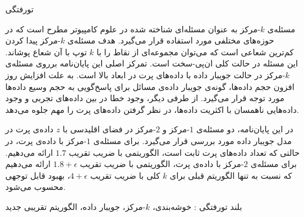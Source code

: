 


\pagestyle{empty}

‌تورفتگی

مسئله‌ی $k$-مرکز به عنوان مسئله‌ای شناخته شده در علوم کامپیوتر مطرح است که در حوزه‌های مختلفی مورد استفاده قرار می‌گیرد. هدف مسئله‌ی $k$-مرکز پیدا کردن کم‌ترین شعاعی است که می‌توان مجموعه‌ای از نقاط را با $k$ توپ با آن شعاع پوشاند. این مسئله در حالت کلی ان‌پی-سخت است. تمرکز اصلی این پایان‌نامه برروی مسئله‌ی $k$-مرکز در حالت جویبار داده با داده‌های پرت در ابعاد بالا است. به علت افزایش روز افزون حجم داده‌ها، گونه‌ی جویبار داده‌ی مسائل برای پاسخ‌گویی به حجم وسیع داده‌ها مورد توجه قرار می‌گیرد. از طرفی دیگر، وجود خطا در بین داده‌های تجربی و وجود داده‌هایی ناهمسان با اکثریت داده‌ها، در نظر گرفتن داده‌های پرت را مهم جلوه می‌دهد.

در این پایان‌نامه، دو مسئله‌ی $1$-مرکز و $2$-مرکز در فضای اقلیدسی با $z$ داده‌ی پرت در مدل جویبار داده مورد بررسی قرار می‌گیرد. برای مسئله‌ی $1$-مرکز با داده‌ی پرت، در حالتی که تعداد داده‌های پرت ثابت است، الگوریتمی با ضریب تقریب $1.7$ ارائه می‌دهیم. برای مسئله‌ی $2$-مرکز با داده‌ی پرت، الگوریتمی با ضریب تقریب $1.8 + \epsilon$ ارائه می‌دهیم که نسبت به تنها الگوریتم قبلی برای $k$ کلی با ضریب تقریب $4 + \epsilon$، بهبود قابل توجهی محسوب می‌شود.

‌بلند
‌تورفتگی : 
خوشه‌بندی، $k$-مرکز، جویبار داده، الگوریتم تقریبی
‌جدید
